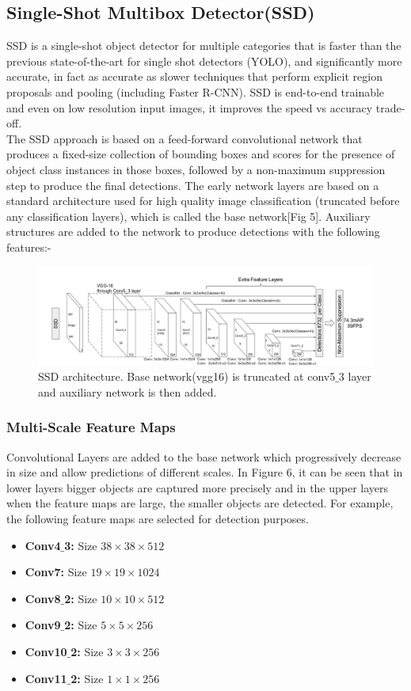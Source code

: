\documentclass[12pt]{article}
\begin{document}
\subsection{Single-Shot Multibox Detector(SSD)}
SSD is a single-shot object detector for multiple categories that is faster than the previous state-of-the-art for single shot detectors (YOLO), and significantly more accurate, in fact as accurate as slower techniques that perform explicit region proposals and pooling (including Faster R-CNN). SSD is end-to-end trainable and even on low resolution input images, it improves the speed vs accuracy trade-off. \\
The SSD approach is based on a feed-forward convolutional network that produces a fixed-size collection of bounding boxes and scores for the presence of object class instances in those boxes, followed by a non-maximum suppression step to produce the final detections. The early network layers are based on a standard architecture used for
high quality image classification (truncated before any classification layers), which is called the base network[Fig 5]. Auxiliary structures are added to the network to produce detections with the following features:-
\begin{figure}[h]
    \centering
    \includegraphics[scale=0.38]{ssd architecture.png}
    \caption{SSD architecture. Base network(vgg16) is truncated at conv5$\_$3 layer and auxiliary network is then added.}
    \label{fig:mesh5}
\end{figure}
\subsubsection{Multi-Scale Feature Maps}
Convolutional Layers are added to the base network which progressively decrease in size and allow predictions of different scales. In Figure 6, it can be seen that in lower layers bigger objects are captured more precisely and in the upper layers when the feature maps are large, the smaller objects are detected. For example, the following feature maps are selected for detection purposes.
\begin{itemize}
    \item \textbf{Conv4$\_$3:} Size $38\times 38\times 512$ 
    \item \textbf{Conv7:} Size $19\times 19\times 1024$ 
    \item \textbf{Conv8$\_$2:} Size $10\times 10\times 512$ 
    \item \textbf{Conv9$\_$2:} Size $5\times 5\times 256$ 
    \item \textbf{Conv10$\_$2:} Size $3\times 3\times 256$
    \item \textbf{Conv11$\_$2:} Size $1\times 1\times 256$ 

\end{itemize}
\end{document}
